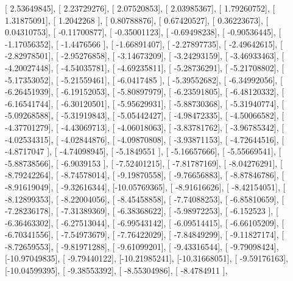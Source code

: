 \documentclass{article}
\begin{document}
       [  2.53649845],
       [  2.23729276],
       [  2.07520853],
       [  2.03985367],
       [  1.79260752],
       [  1.31875091],
       [  1.2042268 ],
       [  0.80788876],
       [  0.67420527],
       [  0.36223673],
       [  0.04310753],
       [ -0.11700877],
       [ -0.35001123],
       [ -0.69498238],
       [ -0.90536445],
       [ -1.17056352],
       [ -1.4476566 ],
       [ -1.66891407],
       [ -2.27897735],
       [ -2.49642615],
       [ -2.82978501],
       [ -2.95276858],
       [ -3.14673209],
       [ -3.24293159],
       [ -3.46933463],
       [ -4.20027448],
       [ -4.54035781],
       [ -4.69235811],
       [ -5.28736291],
       [ -5.21708802],
       [ -5.17353052],
       [ -5.21559461],
       [ -6.0417485 ],
       [ -5.39552682],
       [ -6.34992056],
       [ -6.26451939],
       [ -6.19152053],
       [ -5.80897979],
       [ -6.23591805],
       [ -6.48120332],
       [ -6.16541744],
       [ -6.30120501],
       [ -5.95629931],
       [ -5.88730368],
       [ -5.31940774],
       [ -5.09268588],
       [ -5.31919843],
       [ -5.05442427],
       [ -4.98472335],
       [ -4.50066582],
       [ -4.37701279],
       [ -4.43069713],
       [ -4.06018063],
       [ -3.83781762],
       [ -3.96785342],
       [ -4.02534315],
       [ -4.02844876],
       [ -4.09870808],
       [ -3.93871153],
       [ -4.72644516],
       [ -4.8717047 ],
       [ -4.74098945],
       [ -5.1849551 ],
       [ -5.16657666],
       [ -5.55669541],
       [ -5.88738566],
       [ -6.9039153 ],
       [ -7.52401215],
       [ -7.81787169],
       [ -8.04276291],
       [ -8.79242264],
       [ -8.74578014],
       [ -9.19870558],
       [ -9.76656883],
       [ -8.87846786],
       [ -8.91619049],
       [ -9.32616344],
       [-10.05769365],
       [ -8.91616626],
       [ -8.42154051],
       [ -8.12899353],
       [ -8.22004056],
       [ -8.45458858],
       [ -7.74088253],
       [ -6.85810659],
       [ -7.28236178],
       [ -7.31389369],
       [ -6.38368622],
       [ -5.98972253],
       [ -6.152523  ],
       [ -6.36463302],
       [ -6.27513044],
       [ -6.99543142],
       [ -6.09514415],
       [ -6.66105209],
       [ -6.70341556],
       [ -7.54973679],
       [ -7.76422029],
       [ -7.84849299],
       [ -9.11827174],
       [ -8.72659553],
       [ -9.81971288],
       [ -9.61099201],
       [ -9.43316544],
       [ -9.79098424],
       [-10.97049835],
       [ -9.79440122],
       [-10.21985241],
       [-10.31668051],
       [ -9.59176163],
       [-10.04599395],
       [ -9.38553392],
       [ -8.55304986],
       [ -8.4784911 ],
\end{document}
